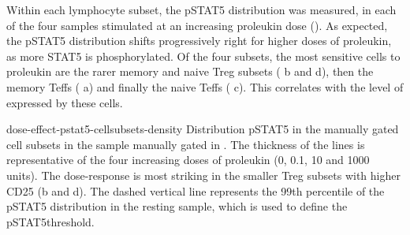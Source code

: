Within each lymphocyte subset, the pSTAT5 distribution was measured, in each of the four samples stimulated at an increasing proleukin dose
().  
As expected, the pSTAT5 distribution shifts progressively right for higher doses of proleukin, as more STAT5 is phosphorylated.
Of the four subsets, the most sensitive cells to proleukin are the rarer memory and naive Treg subsets ( b and d),
then the memory Teffs ( a) and finally the naive Teffs ( c).
This correlates with the level of  expressed by these cells.

{dose-effect-pstat5-cellsubsets-density}
{ Distribution pSTAT5 in the manually gated cell subsets in the sample manually gated in . }
{
The thickness of the lines is representative of the four increasing doses of proleukin (0, 0.1, 10 and 1000 units).
The dose-response is most striking in the smaller Treg subsets with higher CD25 (b and d).
The dashed vertical line represents the 99th percentile of the pSTAT5 distribution in the resting sample,
which is used to define the pSTAT5\positive threshold.
}

